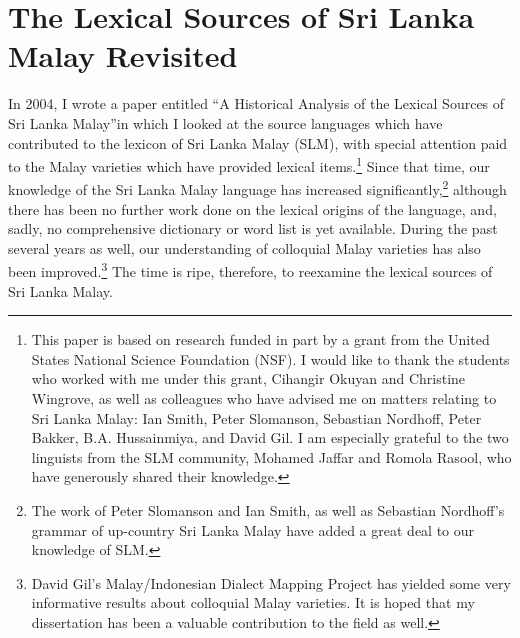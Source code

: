 \chapter[The Lexical Sources of SLM]{The Lexical Sources of Sri Lanka Malay Revisited}


In 2004, I wrote a paper entitled ``A Historical Analysis of the Lexical Sources of Sri Lanka Malay''in which I looked at the source languages which have contributed to the lexicon of Sri Lanka Malay (SLM), with special attention paid to the Malay varieties which have provided lexical items.\footnote{This
 paper is based on research funded in part by a grant from the United States National Science Foundation (NSF). I would like to thank the students who worked with me under this grant, Cihangir Okuyan and Christine Wingrove, as well as colleagues who have advised me on matters relating to Sri Lanka Malay: Ian Smith, Peter Slomanson, Sebastian Nordhoff, Peter Bakker, B.A. Hussainmiya, and David Gil. I am especially grateful to the two linguists from the SLM community, Mohamed Jaffar and Romola Rasool, who have generously shared their knowledge.
} 
Since that time, our knowledge of the Sri Lanka Malay language has increased significantly,\footnote{The
 work of Peter Slomanson and Ian Smith, as well as Sebastian Nordhoff's grammar of up-country Sri Lanka Malay \citep{Nordhoff2009} have added a great deal to our knowledge of SLM. 
}
although there has been no further work done on the lexical origins of the language, and, sadly, no comprehensive dictionary or word list is yet available. During the past several years as well, our understanding of colloquial Malay varieties has also been improved.\footnote{David
 Gil's Malay/Indonesian Dialect Mapping Project has yielded some very informative results about colloquial Malay varieties. It is hoped that my dissertation \citep{Paauw2008} has been a valuable contribution to the field as well. 
}
The time is ripe, therefore, to reexamine the lexical sources of Sri Lanka Malay.

